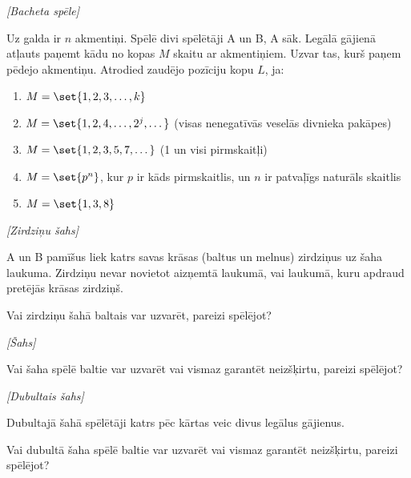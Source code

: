 



\renewcommand{\theenumi}{\alph{enumi}}



\noindent 

\begin{problem}
\textit{[Bacheta spēle]}

Uz galda ir $n$ akmentiņi. 
Spēlē divi spēlētāji A un B, A sāk. 
Legālā gājienā atļauts paņemt kādu no kopas $M$ skaitu ar akmentiņiem. 
Uzvar tas, kurš paņem pēdejo akmentiņu.
Atrodied zaudējo pozīciju kopu $L$, ja:
\begin{enumerate}
\item $M=\set{1,2,3,\dots ,k}$
\item $M=\set{1,2,4,\dots ,2^j, \dots}$ (visas nenegatīvās veselās divnieka pakāpes)
\item $M=\set{1,2,3,5,7,\dots }$ (1 un visi pirmskaitļi)
\item $M=\set{p^n}$, kur $p$ ir kāds pirmskaitlis, un $n$ ir patvaļīgs naturāls skaitlis %
\item $M=\set{1,3,8}$
\end{enumerate}

\end{problem}


\begin{problem}
\textit{[Zirdziņu šahs]}

A un B pamīšus liek katrs savas krāsas (baltus un melnus) zirdziņus uz šaha laukuma. Zirdziņu nevar novietot aizņemtā laukumā, vai laukumā, kuru apdraud pretējās krāsas zirdziņš. 

Vai zirdziņu šahā baltais var uzvarēt, pareizi spēlējot?

\end{problem}

\begin{problem}
\textit{[Šahs]}

Vai šaha spēlē baltie var uzvarēt vai vismaz garantēt neizšķirtu, pareizi spēlējot?

\end{problem}

\begin{problem}
\textit{[Dubultais šahs]}

Dubultajā šahā spēlētāji katrs pēc kārtas veic divus legālus gājienus.

Vai dubultā šaha spēlē baltie var uzvarēt vai vismaz garantēt neizšķirtu, pareizi spēlējot?

\end{problem}

